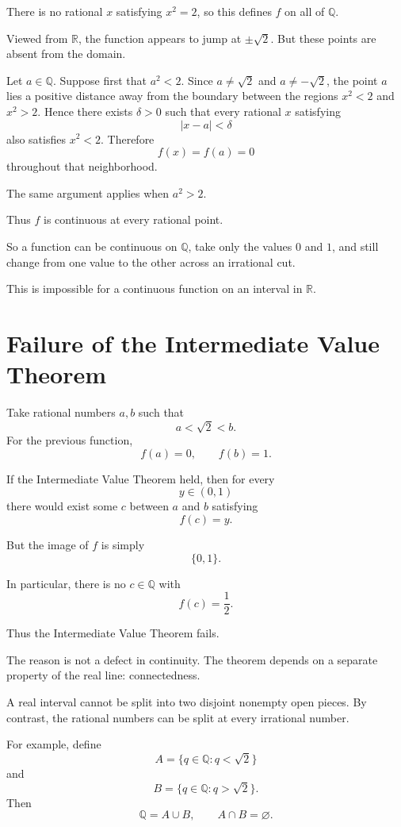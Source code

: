 \documentclass{essay}
\begin{document}
There is no rational \(x\) satisfying \(x^{2}=2\), so this defines \(f\) on all
of \(\mathbb{Q}\).

Viewed from \(\mathbb{R}\), the function appears to jump at
\(\pm\sqrt{2}\). But these points are absent from the domain.

Let \(a\in\mathbb{Q}\). Suppose first that \(a^{2}<2\). Since
\(a\neq \sqrt{2}\) and \(a\neq-\sqrt{2}\), the point \(a\) lies a positive
distance away from the boundary between the regions \(x^{2}<2\) and \(x^{2}>2\).
Hence there exists \(\delta>0\) such that every rational \(x\) satisfying
\[ |x-a|<\delta \]
also satisfies \(x^{2}<2\). Therefore
\[ f(x)=f(a)=0 \]
throughout that neighborhood.

The same argument applies when \(a^{2}>2\).

Thus \(f\) is continuous at every rational point.

So a function can be continuous on \(\mathbb{Q}\), take only the values
\(0\) and \(1\), and still change from one value to the other across an
irrational cut.

This is impossible for a continuous function on an interval in
\(\mathbb{R}\).

\section{Failure of the Intermediate Value Theorem}

Take rational numbers \(a,b\) such that
\[ a<\sqrt{2}<b. \]
For the previous function,
\[ f(a)=0, \qquad f(b)=1. \]

If the Intermediate Value Theorem held, then for every
\[ y\in(0,1) \]
there would exist some \(c\) between \(a\) and \(b\) satisfying
\[ f(c)=y. \]

But the image of \(f\) is simply
\[ \{0,1\}. \]

In particular, there is no \(c\in\mathbb{Q}\) with
\[ f(c)=\frac{1}{2}. \]

Thus the Intermediate Value Theorem fails.

The reason is not a defect in continuity. The theorem depends on a separate
property of the real line: connectedness.

A real interval cannot be split into two disjoint nonempty open pieces. By
contrast, the rational numbers can be split at every irrational number.

For example, define
\[ A=\{q\in\mathbb{Q}:q<\sqrt{2}\} \]
and
\[ B=\{q\in\mathbb{Q}:q>\sqrt{2}\}. \]
Then
\[ \mathbb{Q}=A\cup B, \qquad A\cap B=\varnothing. \]
\end{document}
